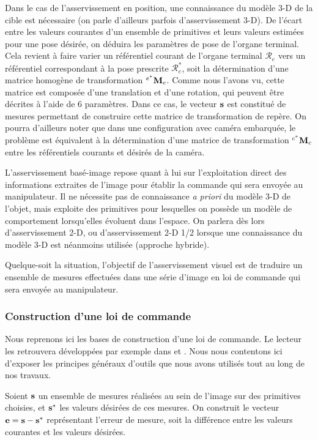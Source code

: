 Dans le cas de l'asservissement en position, une connaissance du modèle 3-D de la cible est nécessaire (on parle d'ailleurs parfois d'asservissement 3-D). De l'écart entre les valeurs courantes d'un ensemble de primitives et leurs valeurs estimées pour une pose désirée, on déduira les paramètres de pose de l'organe terminal. Cela revient à faire varier un référentiel courant de l'organe terminal $\mathcal R_e$ vers un référentiel correspondant à la pose prescrite $\mathcal R_e^*$, soit la détermination d'une matrice homogène de transformation ${}^{e^*}{\bf M}_e$. Comme nous l'avons vu, cette matrice est composée d'une translation et d'une rotation, qui peuvent être décrites à l'aide de $6$ paramètres. Dans ce cas, le vecteur ${\bf s}$ est constitué de mesures permettant de construire cette matrice de transformation de repère. On pourra d'ailleurs noter que dans une configuration avec caméra embarquée, le problème est équivalent à la détermination d'une matrice de transformation ${}^{c^*}{\bf M}_c$ entre les référentiels courants et désirés de la caméra.

L'asservissement basé-image repose quant à lui sur l'exploitation direct des informations extraites de l'image pour établir la commande qui sera envoyée au manipulateur. Il ne nécessite pas de connaissance {\it a priori} du modèle 3-D de l'objet, mais exploite des primitives pour lesquelles on possède un modèle de comportement lorsqu'elles évoluent dans l'espace. On parlera dès lors d'asser\-vissement 2-D, ou d'asservissement 2-D 1/2 lorsque une connaissance du modèle 3-D est néanmoins utilisée (approche hybride).

Quelque-soit la situation, l'objectif de l'asservissement visuel est de traduire un ensemble de mesures effectuées dans une série d'image en loi de commande qui sera envoyée au manipulateur.

\subsubsection{Construction d'une loi de commande}

Nous reprenons ici les bases de construction d'une loi de commande. Le lecteur les retrouvera développées par exemple dans \cite{chaumette:tuto01} et \cite{chaumette:tuto02}. Nous nous contentons ici d'exposer les principes généraux d'outils que nous avons utilisés tout au long de nos travaux.

Soient ${\bf s}$ un ensemble de mesures réalisées au sein de l'image sur des primitives choisies, et ${\bf s}^*$ les valeurs désirées de ces mesures. On construit le vecteur ${\bf e} = {\bf s} - {\bf s}^*$ représentant l'erreur de mesure, soit la différence entre les valeurs courantes et les valeurs désirées.

